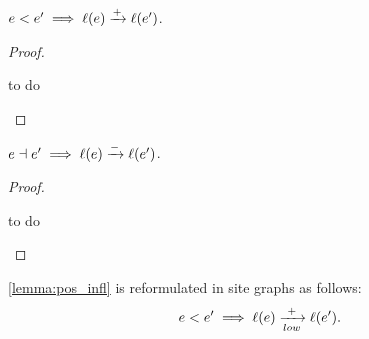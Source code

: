 \begin{lemma}
\label{lemma:pos_infl}
  $e< e'\implies \ell(e)\xrightarrow{+}\ell(e')$.
\end{lemma}
\begin{proof}
  \begin{mdframed}[backgroundcolor=blue!20]
    to do
  \end{mdframed}
\end{proof}

\begin{lemma}
  $e\dashv e' \implies\ell(e)\xrightarrow{-}\ell(e')$.
\end{lemma}
\begin{proof}
  \begin{mdframed}[backgroundcolor=blue!20]
    to do
  \end{mdframed}
\end{proof}

\begin{remark}
  \autoref{lemma:pos_infl} is reformulated in site graphs as follows:
  \[e< e'\implies \ell(e)\xrightarrow[low]{+}\ell(e').\]
\end{remark}
